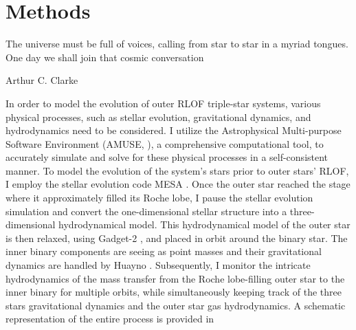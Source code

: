 \chapter{Methods}\label{methods}

\epigraph{The universe must be full of voices, calling from star to star in a myriad tongues. One day we shall join that cosmic conversation}{Arthur C. Clarke}


In order to model the evolution of outer RLOF triple-star systems, various physical processes, such as stellar evolution, gravitational dynamics, and hydrodynamics need to be considered. I utilize the Astrophysical Multi-purpose Software Environment (AMUSE, \cite{portegies2018astrophysical}), a comprehensive computational tool, to accurately simulate and solve for these physical processes in a self-consistent manner. To model the evolution of the system's stars prior to outer stars' RLOF, I employ the stellar evolution code MESA \citep{paxton2010modules,paxton2013modules,paxton2015modules,paxton2019modules}. Once the outer star reached the stage where it approximately filled its Roche lobe, I pause the stellar evolution simulation and convert the one-dimensional stellar structure into a three-dimensional hydrodynamical model. This hydrodynamical model of the outer star is then relaxed, using Gadget-2 \citep{springel2005cosmological}, and placed in orbit around the binary star. The inner binary components are seeing as point masses and their gravitational dynamics are handled by Huayno \citep{pelupessy2012n}. Subsequently, I monitor the intricate hydrodynamics of the mass transfer from the Roche lobe-filling outer star to the inner binary for multiple orbits, while simultaneously keeping track of the three stars gravitational dynamics and the outer star gas hydrodynamics. A schematic representation of the entire process is provided in 




